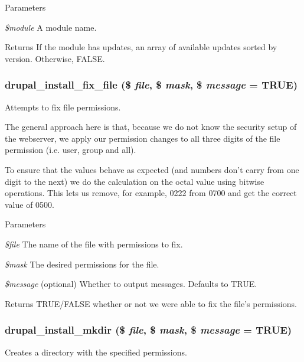 \begin{DoxyParams}{Parameters}
\item[{\em \$module}]A module name. \end{DoxyParams}
\begin{DoxyReturn}{Returns}
If the module has updates, an array of available updates sorted by version. Otherwise, FALSE. 
\end{DoxyReturn}
\hypertarget{install_8inc_a41db1d979ed589c0d16bceb773e113fa}{
\subsubsection[{drupal\_\-install\_\-fix\_\-file}]{\setlength{\rightskip}{0pt plus 5cm}drupal\_\-install\_\-fix\_\-file (\$ {\em file}, \/  \$ {\em mask}, \/  \$ {\em message} = {\ttfamily TRUE})}}
\label{install_8inc_a41db1d979ed589c0d16bceb773e113fa}
Attempts to fix file permissions.

The general approach here is that, because we do not know the security setup of the webserver, we apply our permission changes to all three digits of the file permission (i.e. user, group and all).

To ensure that the values behave as expected (and numbers don't carry from one digit to the next) we do the calculation on the octal value using bitwise operations. This lets us remove, for example, 0222 from 0700 and get the correct value of 0500.


\begin{DoxyParams}{Parameters}
\item[{\em \$file}]The name of the file with permissions to fix. \item[{\em \$mask}]The desired permissions for the file. \item[{\em \$message}](optional) Whether to output messages. Defaults to TRUE.\end{DoxyParams}
\begin{DoxyReturn}{Returns}
TRUE/FALSE whether or not we were able to fix the file's permissions. 
\end{DoxyReturn}
\hypertarget{install_8inc_a125c230acb8711702d23b46feab26820}{
\subsubsection[{drupal\_\-install\_\-mkdir}]{\setlength{\rightskip}{0pt plus 5cm}drupal\_\-install\_\-mkdir (\$ {\em file}, \/  \$ {\em mask}, \/  \$ {\em message} = {\ttfamily TRUE})}}
\label{install_8inc_a125c230acb8711702d23b46feab26820}
Creates a directory with the specified permissions.


